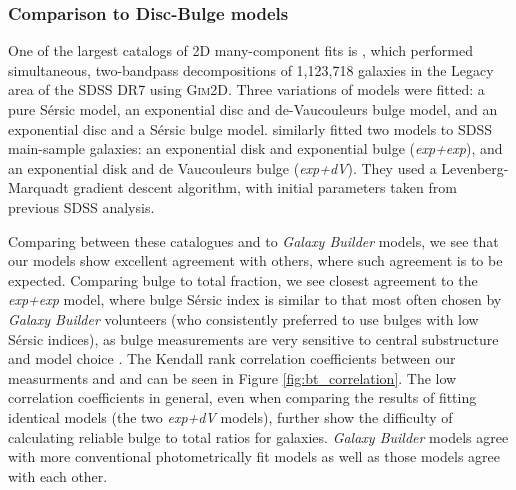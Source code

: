 \documentclass[../main.tex]{subfiles}
\begin{document}
\subsubsection{Comparison to Disc-Bulge models}

One of the largest catalogs of 2D many-component fits is \citet{Simard2011:1107.1518v1}, which performed simultaneous, two-bandpass decompositions of 1,123,718 galaxies in the Legacy area of the SDSS DR7 using \textsc{Gim2D}. Three variations of models were fitted: a pure S\'ersic model, an exponential disc and de-Vaucouleurs bulge model, and an exponential disc and a S\'ersic bulge model. \citet{2012MNRAS.421.2277L} similarly fitted two models to SDSS main-sample galaxies: an exponential disk and exponential bulge (\textit{exp+exp}), and an exponential disk and de Vaucouleurs bulge (\textit{exp+dV}). They used a Levenberg-Marquadt gradient descent algorithm, with initial parameters taken from previous SDSS analysis.

Comparing between these catalogues and to \textit{Galaxy Builder} models, we see that our models show excellent agreement with others, where such agreement is to be expected. Comparing bulge to total fraction, we see closest agreement to the \textit{exp+exp} model, where bulge S\'ersic index is similar to that most often chosen by \textit{Galaxy Builder} volunteers (who consistently preferred to use bulges with low S\'ersic indices), as bulge measurements are very sensitive to central substructure and model choice \citep{Gao2017:1709.00746v1}. The Kendall rank correlation coefficients between our measurments and \citet{Simard2011:1107.1518v1} and \citet{2012MNRAS.421.2277L} can be seen in Figure \ref{fig:bt_correlation}. The low correlation coefficients in general, even when comparing the results of fitting identical models (the two \textit{exp+dV} models), further show the difficulty of calculating reliable bulge to total ratios for galaxies. \textit{Galaxy Builder} models agree with more conventional photometrically fit models as well as those models agree with each other.
\end{document}
